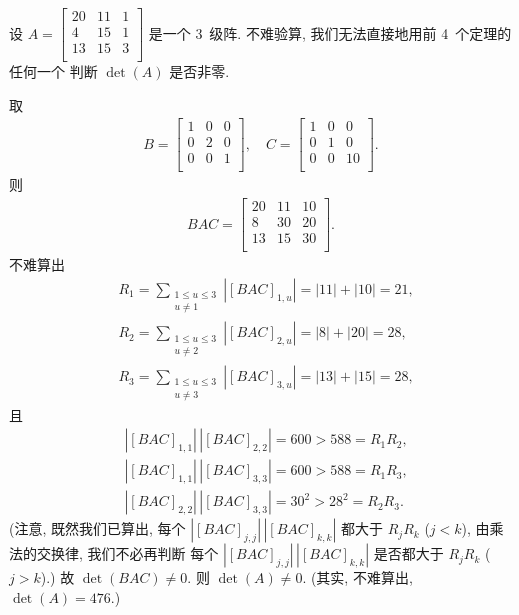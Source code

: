 \documentclass[../libro.tex]{subfiles}
\begin{document}
\begin{example}\label{emp:NonzeroDet2}
    设 \(A =
        \begin{bmatrix}
            20 & 11 & 1 \\
            4  & 15 & 1 \\
            13 & 15 & 3 \\
    \end{bmatrix}\)
    是一个 \(3\)~级阵.
    不难验算, 我们无法直接地用前 4~个定理的任何一个%
    判断 \(\det {(A)}\) 是否非零.

    取
    \begin{align*}
        B =
        \begin{bmatrix}
            1 & 0 & 0 \\
            0 & 2 & 0 \\
            0 & 0 & 1 \\
        \end{bmatrix},
        \quad
        C =
        \begin{bmatrix}
            1 & 0 & 0  \\
            0 & 1 & 0  \\
            0 & 0 & 10 \\
        \end{bmatrix}.
    \end{align*}
    则
    \begin{align*}
        BAC =
        \begin{bmatrix}
            20 & 11 & 10 \\
            8  & 30 & 20 \\
            13 & 15 & 30 \\
        \end{bmatrix}.
    \end{align*}
    不难算出
    \begin{align*}
        & R_1 = \sum_{\substack{1 \leq u \leq 3 \\ u \neq 1}}
        {|[BAC]_{1,u}|} = |11| + |10| = 21, \\
        & R_2 = \sum_{\substack{1 \leq u \leq 3 \\ u \neq 2}}
        {|[BAC]_{2,u}|} = |8| + |20| = 28, \\
        & R_3 = \sum_{\substack{1 \leq u \leq 3 \\ u \neq 3}}
        {|[BAC]_{3,u}|} = |13| + |15| = 28,
    \end{align*}
    且
    \begin{align*}
        & |[BAC]_{1,1}|\,|[BAC]_{2,2}|
        = 600 > 588 = R_1 R_2, \\
        & |[BAC]_{1,1}|\,|[BAC]_{3,3}|
        = 600 > 588 = R_1 R_3, \\
        & |[BAC]_{2,2}|\,|[BAC]_{3,3}|
        = 30^2 > 28^2 = R_2 R_3.
    \end{align*}
    (注意, 既然我们已算出, %
    每个 \(|[BAC]_{j,j}|\,|[BAC]_{k,k}|\)
    都大于 \(R_j R_k\)
    (\(j < k\)),
    由乘法的交换律,
    我们不必再判断%
    每个 \(|[BAC]_{j,j}|\,|[BAC]_{k,k}|\)
    是否都大于 \(R_j R_k\)
    (\(j > k\)).) %
    故 \(\det {(BAC)} \neq 0\).
    则 \(\det {(A)} \neq 0\).
    (其实, 不难算出, \(\det {(A)} = 476.\))
\end{example}
\end{document}
